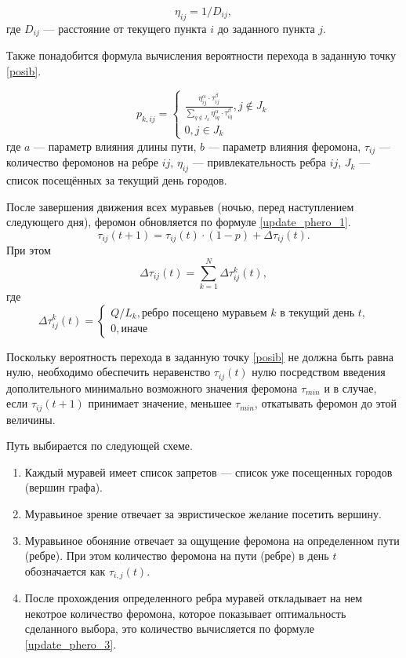 \begin{equation}
	\label{d_func}
	\eta_{ij} = 1 / D_{ij},
\end{equation}
где $D_{ij}$ — расстояние от текущего пункта $i$ до заданного пункта $j$.


Также понадобится формула вычисления вероятности перехода в заданную точку \eqref{posib}.

\begin{equation}
	\label{posib}
	p_{k,ij} = \begin{cases}
		\frac{\eta_{ij}^{\alpha}\cdot\tau_{ij}^{\beta}}{\sum_{q\notin J_k} \eta^\alpha_{iq}\cdot\tau^\beta_{iq}}, j \notin J_k \\
		0, j \in J_k
	\end{cases}
\end{equation}
где $a$ --- параметр влияния длины пути, $b$ --- параметр влияния феромона, $\tau_{ij}$ --- количество феромонов на ребре $ij$, $\eta_{ij}$ --- привлекательность ребра $ij$, $J_k$ --- список посещённых за текущий день городов.

После завершения движения всех муравьев (ночью, перед наступлением следующего дня), феромон обновляется по формуле \eqref{update_phero_1}.
\begin{equation}
	\label{update_phero_1}
	\tau_{ij}(t+1) = \tau_{ij}(t)\cdot(1-p) + \Delta \tau_{ij}(t).
\end{equation}
При этом
\begin{equation}
	\label{update_phero_2}
	\Delta \tau_{ij}(t) = \sum_{k=1}^N \Delta \tau^k_{ij}(t),
\end{equation}
где
\begin{equation}
	\label{update_phero_3}
	\Delta\tau^k_{ij}(t) = \begin{cases}
		Q/L_{k}, \textrm{ребро посещено муравьем $k$ в текущий день $t$,} \\
		0, \textrm{иначе}
	\end{cases}
\end{equation}

Поскольку вероятность перехода в заданную точку \ref{posib} не должна быть равна нулю, необходимо обеспечить неравенство $\tau_{ij} (t)$ нулю посредством введения дополительного минимально возможного значения феромона $\tau_{min}$ и в случае, если $\tau_{ij} (t+1)$ принимает значение, меньшее $\tau_{min}$, откатывать феромон до этой величины. 


Путь выбирается по следующей схеме.
\begin{enumerate}
	\item Каждый муравей имеет список запретов --- список уже посещенных городов (вершин графа).
	\item Муравьиное зрение отвечает за эвристическое желание посетить вершину.
	\item Муравьиное обоняние отвечает за ощущение феромона на определенном пути (ребре). При этом количество феромона на пути (ребре) в день $t$ обозначается как $\tau_{i, j} (t)$.
	\item После прохождения определенного ребра муравей откладывает на нем некотрое количество феромона, которое показывает оптимальность сделанного выбора, это количество вычисляется по формуле \eqref{update_phero_3}.
\end{enumerate}

